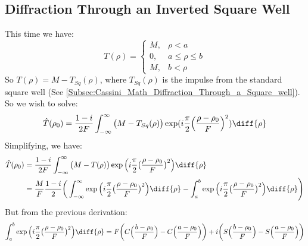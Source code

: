 \documentclass[crop=false,class=book,oneside]{standalone}
\begin{document}
        \subsection{Diffraction Through an Inverted Square Well}
            This time we have:
            \begin{equation*}
                T(\rho)=
                \begin{cases}
                    M,&\rho<a\\
                    0,&a\leq\rho\leq{b}\\
                    M,&b<\rho
                \end{cases}    
            \end{equation*}
            So $T(\rho) = M - T_{Sq}(\rho)$,
            where $T_{Sq}(\rho)$ is the impulse from the standard
            square well (See
            \ref{Subsec:Cassini_Math_Diffraction_Through_a_Square_well}).
            So we wish to solve:
            \begin{equation*}
                \hat{T}(\rho_{0})=
                \frac{1-i}{2F}\int_{-\infty}^{\infty}
                \big(M-T_{Sq}(\rho)\big)
                \exp(i\frac{\pi}{2}\Big(\frac{\rho-\rho_{0}}{F}\Big)^{2})
                \diff{\rho}
            \end{equation*}
                Simplifying, we have:
                \begin{align*}
                    \hat{T}(\rho_{0})
                    &=\frac{1-i}{2F}\int_{-\infty}^{\infty}
                    \big(M-T(\rho)\big)
                    \exp\Big(i\frac{\pi}{2}
                        \big(\frac{\rho-\rho_0}{F}\big)^{2}\Big)
                    \diff{\rho}\\
                    &=\frac{M}{F}\frac{1-i}{2}
                    \bigg(\int_{-\infty}^{\infty}
                    \exp\Big(i\frac{\pi}{2}
                        \big(\frac{\rho-\rho_0}{F}\big)^2\Big)
                    \diff{\rho}-
                    \int_{a}^{b}
                    \exp\Big(i\frac{\pi}{2}
                        \big(\frac{\rho-\rho_0}{F}\big)^2\Big)
                    \diff{\rho}\Bigg)\\
                \end{align*}
                But from the previous derivation:
                \begin{equation*}
                    \int_{a}^{b}
                    \exp\Big(i\frac{\pi}{2}
                        \big(\frac{\rho-\rho_0}{F}\big)^{2}\Big)
                    \diff{\rho}
                    =F\bigg(C\Big(\frac{b-\rho_0}{F}\Big)-
                    C\Big(\frac{a-\rho_0}{F}\Big)\bigg)+
                    i\bigg(S\Big(\frac{b-\rho_0}{F}\Big)-
                    S\Big(\frac{a-\rho_0}{F}\Big)\bigg)
                \end{equation*}
\end{document}
